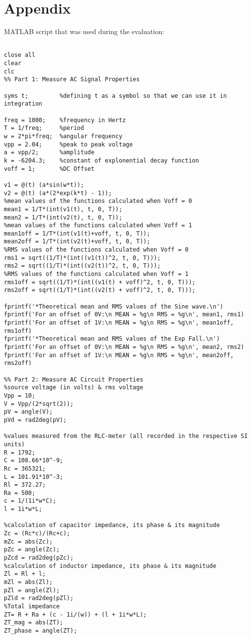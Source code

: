 \documentclass[12pt]{report}
\begin{document}
\chapter{Appendix}
MATLAB script that was used during the evaluation:
\begin{verbatim}

close all
clear
clc
%% Part 1: Measure AC Signal Properties

syms t;         %defining t as a symbol so that we can use it in integration

freq = 1000;    %frequency in Hertz
T = 1/freq;     %period
w = 2*pi*freq;  %angular frequency 
vpp = 2.04;     %peak to peak voltage
a = vpp/2;      %amplitude
k = -6204.3;    %constant of explonential decay function
voff = 1;       %DC Offset

v1 = @(t) (a*sin(w*t));
v2 = @(t) (a*(2*exp(k*t) - 1));
%mean values of the functions calculated when Voff = 0
mean1 = 1/T*(int(v1(t), t, 0, T));                 
mean2 = 1/T*(int(v2(t), t, 0, T)); 
%mean values of the functions calculated when Voff = 1
mean1off = 1/T*(int(v1(t)+voff, t, 0, T));              
mean2off = 1/T*(int(v2(t)+voff, t, 0, T));        
%RMS values of the functions calculated when Voff = 0
rms1 = sqrt((1/T)*(int((v1(t))^2, t, 0, T)));      
rms2 = sqrt((1/T)*(int((v2(t))^2, t, 0, T)));
%RMS values of the functions calculated when Voff = 1
rms1off = sqrt((1/T)*(int((v1(t) + voff)^2, t, 0, T)));
rms2off = sqrt((1/T)*(int((v2(t) + voff)^2, t, 0, T)));

fprintf('*Theoretical mean and RMS values of the Sine wave.\n')
fprintf('For an offset of 0V:\n MEAN = %g\n RMS = %g\n', mean1, rms1)
fprintf('For an offset of 1V:\n MEAN = %g\n RMS = %g\n', mean1off, rms1off)
fprintf('*Theoretical mean and RMS values of the Exp Fall.\n')
fprintf('For an offset of 0V:\n MEAN = %g\n RMS = %g\n', mean2, rms2)
fprintf('For an offset of 1V:\n MEAN = %g\n RMS = %g\n', mean2off, rms2off)

%% Part 2: Measure AC Circuit Properties
%source voltage (in volts) & rms voltage
Vpp = 10;                          
V = Vpp/(2*sqrt(2));  
pV = angle(V);
pVd = rad2deg(pV);

%values measured from the RLC-meter (all recorded in the respective SI units)
R = 1792;                         
C = 108.66*10^-9;
Rc = 365321;
L = 101.91*10^-3;
Rl = 372.27;
Ra = 500;
c = 1/(1i*w*C);
l = 1i*w*L;

%calculation of capacitor impedance, its phase & its magnitude
Zc = (Rc*c)/(Rc+c);              
mZc = abs(Zc);
pZc = angle(Zc);
pZcd = rad2deg(pZc);
%calculation of inductor impedance, its phase & its magnitude
Zl = Rl + l;                     
mZl = abs(Zl);
pZl = angle(Zl);
pZld = rad2deg(pZl);
%Total impedance
ZT= R + Ra + (c - 1i/(w)) + (l + 1i*w*L); 
ZT_mag = abs(ZT);
ZT_phase = angle(ZT); 


\end{verbatim}
\end{document}
